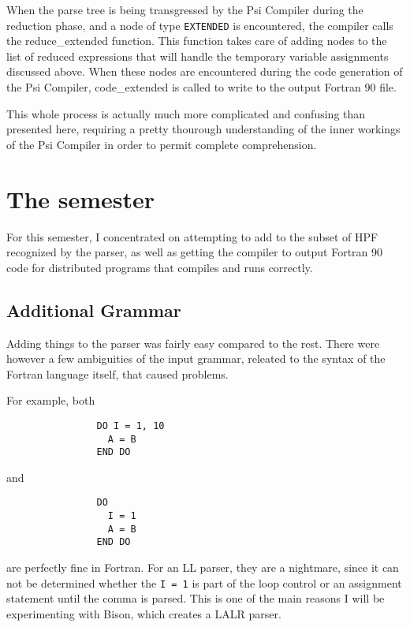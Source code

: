 When the parse tree is being transgressed by the Psi Compiler during the
reduction phase, and a node
of type {\tt EXTENDED} is encountered, the compiler calls the 
reduce\_extended function.   This function takes care of adding nodes
to the list of reduced expressions that will handle the temporary
variable assignments discussed above.  When these nodes are encountered during
the code generation of the Psi Compiler, code\_extended is called to
write to the output Fortran 90 file. 

This whole process is actually much more complicated and confusing than
presented here, requiring a pretty thourough understanding of the inner
workings of the Psi Compiler in order to permit complete comprehension.  


\section{The semester}
For this semester, I concentrated on attempting to add to the 
subset of HPF recognized by the parser, as well as getting the compiler
to output Fortran 90 code for distributed programs that compiles and
runs correctly.

\subsection{Additional Grammar}
Adding things to the parser was fairly easy compared to the
rest.  There were however a few ambiguities of the input grammar, releated
to the syntax of the Fortran language itself, that caused problems.

For example, both
\begin{verbatim}
                DO I = 1, 10
                  A = B
                END DO
\end{verbatim}
and
\begin{verbatim}
                DO
                  I = 1
                  A = B
                END DO
\end{verbatim}
are perfectly fine in Fortran.  For an LL parser, they are a nightmare,
since it can not be determined whether the {\tt I = 1} is part of the
loop control or an assignment statement until the comma is parsed.  
This is one of the main reasons I will be experimenting with Bison,
which creates a LALR parser.

